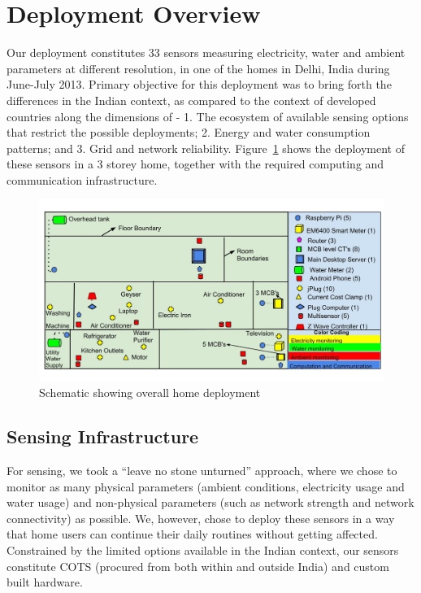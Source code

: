 \documentclass[10pt]{sensys-proc}
\newcommand{\figref}[1]{Figure~\ref{#1}}
\begin{document}
\section{Deployment Overview}
Our deployment constitutes 33 sensors measuring electricity, water and ambient parameters at different resolution, in one of the homes in Delhi, India during June-July 2013. Primary objective for this deployment was to bring forth the differences in the Indian context, as compared to the context of developed countries along the dimensions of - 1. The ecosystem of available sensing options that restrict the possible deployments; 2. Energy and water consumption patterns; and 3. Grid and network reliability. \figref{fig:overall} shows the deployment of these sensors in a 3 storey home, together with the required computing and communication infrastructure. %

\begin{figure} 
	\vspace{-5mm}    
    \includegraphics[scale=0.19]{./figures/overall_deployment.jpg}
    \vspace{-10mm}    
    \caption{Schematic showing overall home deployment}   
    \label{fig:overall}
\end{figure}

\subsection{Sensing Infrastructure}
\label{sec:sensing}
For sensing, we took a ``leave no stone unturned'' approach, where  we chose to monitor as many physical parameters (ambient conditions, electricity usage and water usage) and non-physical parameters (such as network strength and network connectivity) as possible. We, however, chose to deploy these sensors in a way that home users can continue their daily routines without getting affected. Constrained by the limited options available in the Indian context, our sensors constitute COTS (procured from both within and outside India) and custom built hardware. %
\end{document}
